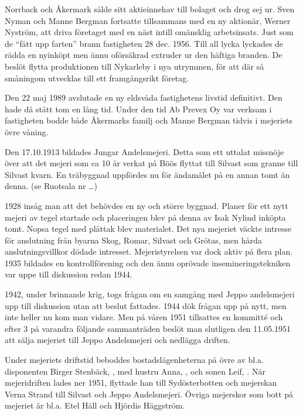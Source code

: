 Norrback och Åkermark sålde sitt aktieinnehav till bolaget och drog sej ur. Sven Nyman och Manne Bergman fortsatte tillsammans med en ny aktionär, Werner Nyström, att  driva företaget med en näst intill omänsklig arbetsinsats. Just som de ``fått upp farten'' brann fastigheten 28 dec. 1956. Till all lycka lyckades de rädda en nyinköpt men ännu oförsäkrad extruder ur den häftiga branden. De beslöt flytta produktionen till Nykarleby i nya utrymmen, för att där så småningom utvecklas till ett framgångsrikt företag.

Den 22 maj 1989 avslutade en ny eldsvåda fastighetens livstid definitivt. Den hade då stått tom en lång tid. Under den tid Ab Prevex Oy var verksam i fastigheten bodde både Åkermarks familj och Manne Bergman tidvis i mejeriets övre våning.


Den 17.10.1913 bildades Jungar Andelsmejeri. Detta som ett uttalat missnöje över att det mejeri som ca 10 år verkat på Böös flyttat till Silvast som granne till Silvast kvarn. En träbyggnad uppfördes nu för ändamålet på en annan tomt än denna. (se Ruotsala nr …)

1928 insåg man att det behövdes en ny och större byggnad. Planer för ett nytt mejeri av tegel startade och placeringen blev på denna av Isak Nylind inköpta tomt. Nopsa tegel med plåttak blev materialet. Det nya mejeriet väckte intresse för anslutning från byarna  Skog, Romar, Silvast och Grötas, men hårda anslutningsvillkor dödade intresset. Mejeristyrelsen var dock aktiv på flera plan. 1935 bildades en kontrollförening och den ännu oprövade insemineringstekniken var uppe till diskussion redan 1944.

1942, under brinnande krig, togs frågan om en samgång med Jeppo andelsmejeri upp till diskussion utan att beslut fattades. 1944 dök frågan upp på nytt, men inte heller nu kom man vidare. Men på våren 1951 tillsattes en kommitté och efter 3 på varandra följande sammanträden beslöt man slutligen den 11.05.1951 att sälja  mejeriet till Jeppo Andelsmejeri och nedlägga driften.

Under mejeriets driftstid beboddes bostadslägenheterna  på övre av bl.a. disponenten Birger Stenbäck, , med hustru Anna, , och sonen Leif, . När mejeridriften lades ner 1951, flyttade han till Sydösterbotten och mejerskan Verna Strand till Silvast och Jeppo Andelsmejeri. Övriga mejerskor som  bott på mejeriet är bl.a. Etel Häll och Hjördis Häggström.




